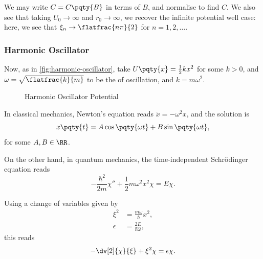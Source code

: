 We may write \(C = C\pqty{B}\) in terms of \(B\), and normalise to find \(C\). We also see that taking \(U_0 \to \infty\) and \(r_0 \to \infty\), we recover the infinite potential well case: here, we see that \(\xi_n \to \flatfrac{n \pi}{2}\) for \(n = 1, 2, \ldots\).

\subsubsection{Harmonic Oscillator}

Now, as in \autoref{fig:harmonic-oscillator}, take \(U\pqty{x} = \frac{1}{2} k x^2\) for some  \(k > 0\), and \(\omega = \sqrt{\flatfrac{k}{m}}\) to be the  of oscillation, and \(k = m \omega^2\).

\begin{figure}[ht]
    \centering
    \caption{Harmonic Oscillator Potential}
    \label{fig:harmonic-oscillator}%
\end{figure}

In classical mechanics, Newton's equation reads \(\ddot{x} = - \omega^2 x\), and the solution is
\begin{equation}
    x\pqty{t} = A \cos \pqty{\omega t} + B \sin \pqty{\omega t},
\end{equation}
for some \(A, B \in \RR\).

On the other hand, in quantum mechanics, the time-independent Schr\"{o}dinger equation reads
\begin{equation}
    - \frac{\hbar^2}{2 m} \chi'' + \frac{1}{2} m \omega^2 x^2 \chi = E \chi.
\end{equation}

Using a change of variables given by
\begin{subequations}
    \begin{align}
        \xi^2 &= \frac{m \omega}{\hbar} x^2, \\
        \epsilon &= \frac{2 E}{\hbar \omega},
    \end{align}
\end{subequations}
this reads
\begin{equation}
    - \dv[2]{\chi}{\xi} + \xi^2 \chi = \epsilon \chi.
\end{equation}

